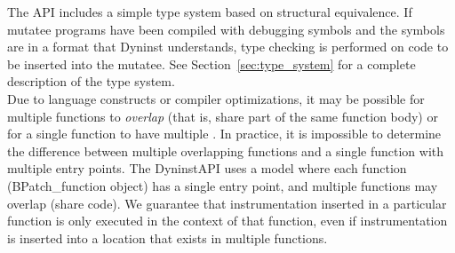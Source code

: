 The API includes a simple type system based on structural equivalence.  If mutatee programs have been compiled with debugging symbols and the symbols are in a format that Dyninst understands, type checking is performed on code to be inserted into the mutatee.  See Section~\ref{sec:type_system} for a complete description of the type system.\\

Due to language constructs or compiler optimizations, it may be possible for multiple functions to \textit{overlap} (that is, share part of the same function body) or for a single function to have multiple \entrypoints .  In practice, it is impossible to determine the difference between multiple overlapping functions and a single function with multiple entry points.  The DyninstAPI uses a model where each function (BPatch\_function object) has a single entry point, and multiple functions may overlap (share code).  We guarantee that instrumentation inserted in a particular function is only executed in the context of that function, even if instrumentation is inserted into a location that exists in multiple functions. 
\pagebreak